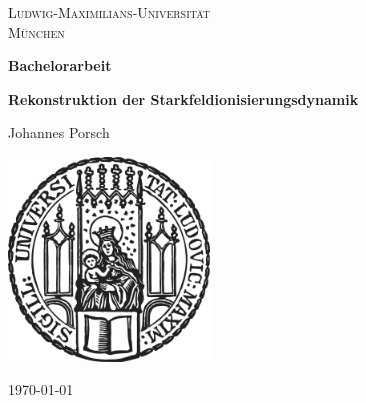 \begin{titlepage}
    \centering
    
    \begin{center}
        {\Large\textsc{Ludwig-Maximilians-Universität}}\\
        \vspace{0.25cm}
        {\Large\textsc{München}}
    \end{center}

    \vspace{0.5cm}

    
    \vspace{2cm}

    {\Large \bfseries Bachelorarbeit}

    \vspace{0.5cm}
    
    {\huge\bfseries Rekonstruktion der Starkfeldionisierungsdynamik\\[0.4cm]}
    
    \vspace{1.5cm}
    
    {\Large Johannes Porsch}
    
    
    \vfill
    
    \includegraphics[width = 0.4\textwidth]{figures/sigillum.png}

    \vfill
    
    {\Large \today}
    
\end{titlepage}